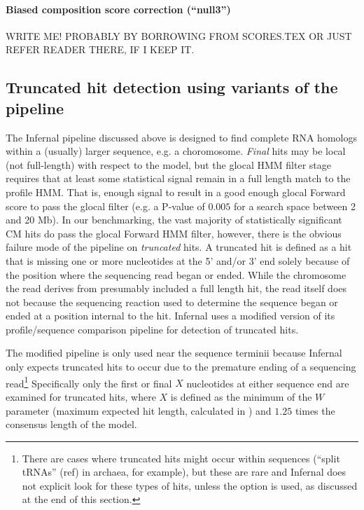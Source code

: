 \begin{sreoutput}
\paragraph{Biased composition score correction (``null3'')}
WRITE ME! PROBABLY BY BORROWING FROM SCORES.TEX OR JUST REFER READER
THERE, IF I KEEP IT.

\subsection{Truncated hit detection using variants of the pipeline}

The Infernal pipeline discussed above is designed to find complete RNA
homologs within a (usually) larger sequence, e.g. a choromosome.
\emph{Final} hits may be local (not full-length) with respect to the
model, but the glocal HMM filter stage requires that at least some
statistical signal remain in a full length match to the profile
HMM. That is, enough signal to result in a good enough glocal Forward
score to pass the glocal filter (e.g. a P-value of $0.005$ for a
search space between 2 and 20 Mb). In our benchmarking, the vast
majority of statistically significant CM hits do pass the glocal
Forward HMM filter, however, there is the obvious failure mode of the
pipeline on \emph{truncated} hits. A truncated hit is defined as a hit
that is missing one or more nucleotides at the 5' and/or 3' end solely
because of the position where the sequencing read began or
ended. While the chromosome the read derives from presumably included a
full length hit, the read itself does not because the sequencing
reaction used to determine the sequence began or ended at a position
internal to the hit. Infernal uses a modified version of its
profile/sequence comparison pipeline for detection of truncated hits.

The modified pipeline is only used near the sequence terminii because
Infernal only expects truncated hits to occur due to the premature
ending of a sequencing read\footnote{There are cases where truncated
hits might occur within sequences (``split tRNAs'' (ref) in archaea,
for example), but these are rare and Infernal does not explicit look
for these types of hits, unless the  option is used,
as discussed at the end of this section.} Specifically only the first
or final $X$ nucleotides at either sequence end are examined for
truncated hits, where $X$ is defined as the minimum of the $W$
parameter (maximum expected hit length, calculated in )
and $1.25$ times the consensus length of the model.


\end{sreoutput}
